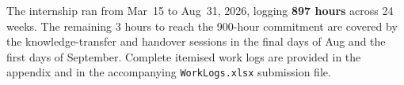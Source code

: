 The internship ran from Mar~15 to Aug~31, 2026, logging
\textbf{897 hours} across 24 weeks. The remaining 3 hours to reach the
900-hour commitment are covered by the knowledge-transfer and handover
sessions in the final days of Aug and the first days of September.
Complete itemised work logs are provided in the appendix and in the
accompanying \texttt{WorkLogs.xlsx} submission file.
